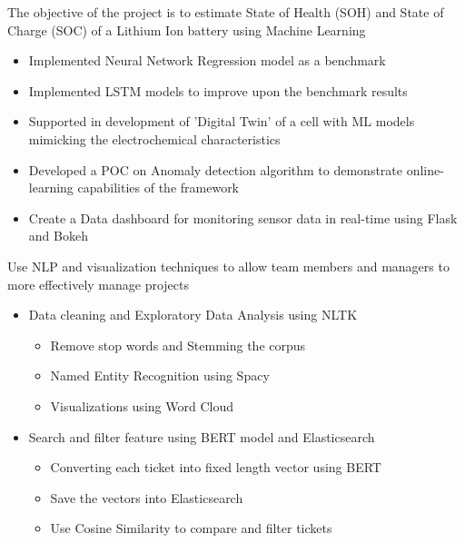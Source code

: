 \documentclass[10pt,a4paper,ragged2e,withhyper]{altacv}
\begin{document}
            The objective of the project is to estimate State of Health (SOH) and State of Charge (SOC) of a Lithium Ion battery using Machine Learning
            \begin{itemize}
                \item Implemented Neural Network Regression model as a benchmark
                \item Implemented LSTM models to improve upon the benchmark results
                \item Supported in development of 'Digital Twin' of a cell with ML models mimicking the electrochemical characteristics
                \item Developed a POC on Anomaly detection algorithm to demonstrate online-learning capabilities of the framework
                \item Create a Data dashboard for monitoring sensor data in real-time using Flask and Bokeh
            \end{itemize}
            \divider

            Use NLP and visualization techniques to allow team members and managers to more effectively manage projects \linebreak
            \begin{itemize}
                \item Data cleaning and Exploratory Data Analysis using NLTK
                    \begin{itemize}
                        \item Remove stop words and Stemming the corpus
                        \item Named Entity Recognition using Spacy
                        \item Visualizations using Word Cloud
                    \end{itemize}
                \item Search and filter feature using BERT model and Elasticsearch
                \begin{itemize}
                    \item Converting each ticket into fixed length vector using BERT
                    \item Save the vectors into Elasticsearch
                    \item Use Cosine Similarity to compare and filter tickets
                \end{itemize}
            \end{itemize}
            \divider
\end{document}
